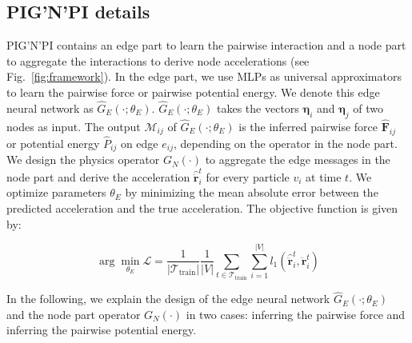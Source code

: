 \documentclass{article}
\newcommand{\pignpi}{PIG'N'PI\xspace}
\begin{document}



\subsection{PIG’N’PI details}
\label{sec:method_overview}
\pignpi contains an edge part to learn the pairwise interaction and a node part to aggregate the interactions to derive node accelerations (see Fig.~\ref{fig:framework}). In the edge part, we use MLPs as universal approximators~\cite{hornik1989multilayer, hornik1991approximation} to learn the pairwise force or pairwise potential energy. We denote this edge neural network as $\hat{G}_E(\cdot; \theta_{E})$. $\hat{G}_E(\cdot; \theta_{E})$ takes the vectors $\bm{\eta}_i$ and $\bm{\eta}_j$ of two nodes as input. The output $\mathcal{M}_{ij}$ of $\hat{G}_E(\cdot; \theta_{E})$ is the inferred pairwise force $\bm{\hat{F}}_{ij}$ or potential energy $\hat{P}_{ij}$ on edge $e_{ij}$, depending on the operator in the node part. We design the physics operator $G_N(\cdot)$ to aggregate the edge messages in the node part and derive the acceleration $\bm{\hat{\ddot{r}}}^t_i$ for every particle $v_i$ at time $t$. We optimize parameters $\theta_{E}$ by minimizing the mean absolute error between the predicted acceleration and the true acceleration. The objective function is given by:

\begin{equation}
\label{eq:objective_func}
    \arg\min_{\theta_{E}} \mathcal{L} = \frac{1}{|\mathcal{T}_{\text{train}}|} \frac{1}{|V|} \sum_{t \in \mathcal{T}_{\text{train}}} \sum_{i=1}^{|V|} l_1(\bm{\hat{\ddot{r}}}_i^t,\bm{\ddot{r}}_i^t)
\end{equation}



In the following, we explain the design of the edge neural network $\hat{G}_E(\cdot; \theta_{E})$ and the node part operator $G_N(\cdot)$ in two cases: inferring the pairwise force and inferring the pairwise potential energy.

\end{document}
